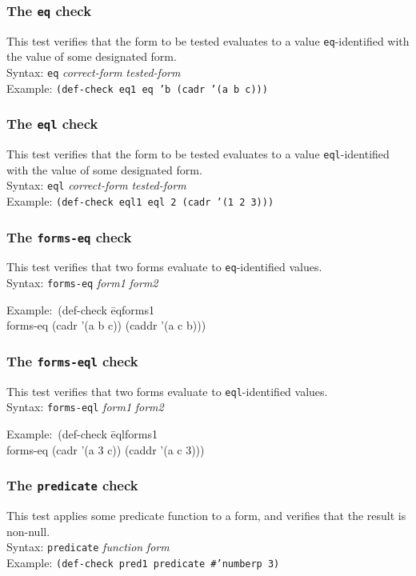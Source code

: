 \documentclass{article}
\begin{document}
\subsubsection{The \texttt{eq} check} 
This test verifies that the form to be tested evaluates to a value
\texttt{eq}-identified with the value of some designated form.
\\ Syntax: \texttt{eq} \textit{correct-form} \textit{tested-form}
\\ Example: \texttt{(def-check eq1 eq 'b (cadr '(a b c)))}

\subsubsection{The \texttt{eql} check} 
This test verifies that the form to be tested evaluates to a value
\texttt{eql}-identified with the value of some designated form.
\\ Syntax: \texttt{eql} \textit{correct-form} \textit{tested-form}
\\ Example: \texttt{(def-check eql1 eql 2 (cadr '(1 2 3)))}

\subsubsection{The \texttt{forms-eq} check} 
This test verifies that two forms evaluate to \texttt{eq}-identified
values.
\\ Syntax: \texttt{forms-eq} \textit{form1} \textit{form2}
{\ttfamily\begin{tabbing}
\textrm{Example:}\ (def-check \=eqforms1
\\ \>  forms-eq (cadr '(a b c)) (caddr '(a c b)))
\end{tabbing}}

\subsubsection{The \texttt{forms-eql} check} 
This test verifies that two forms evaluate to \texttt{eql}-identified
values.
\\ Syntax: \texttt{forms-eql} \textit{form1} \textit{form2}
{\ttfamily\begin{tabbing}
\textrm{Example:}\ (def-check \=eqlforms1
\\ \>  forms-eq (cadr '(a 3 c)) (caddr '(a c 3)))
\end{tabbing}}

\subsubsection{The \texttt{predicate} check} 
This test applies some predicate function to a form, and verifies that
the result is non-null.
\\ Syntax: \texttt{predicate} \textit{function} \textit{form}
\\ Example: \texttt{(def-check pred1 predicate \#'numberp 3)}
\end{document}

